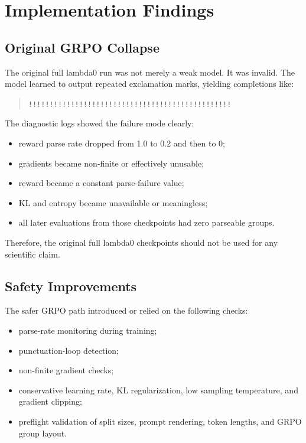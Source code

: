 \documentclass[11pt]{article}
\begin{document}
\section{Implementation Findings}

\subsection{Original GRPO Collapse}

The original full lambda0 run was not merely a weak model. It was invalid. The
model learned to output repeated exclamation marks, yielding completions like:

\begin{quote}
\texttt{!!!!!!!!!!!!!!!!!!!!!!!!!!!!!!!!!!!!!!!!!!!!!!!!}
\end{quote}

The diagnostic logs showed the failure mode clearly:

\begin{itemize}
  \item reward parse rate dropped from 1.0 to 0.2 and then to 0;
  \item gradients became non-finite or effectively unusable;
  \item reward became a constant parse-failure value;
  \item KL and entropy became unavailable or meaningless;
  \item all later evaluations from those checkpoints had zero parseable groups.
\end{itemize}

Therefore, the original full lambda0 checkpoints should not be used for any
scientific claim.

\subsection{Safety Improvements}

The safer GRPO path introduced or relied on the following checks:

\begin{itemize}
  \item parse-rate monitoring during training;
  \item punctuation-loop detection;
  \item non-finite gradient checks;
  \item conservative learning rate, KL regularization, low sampling temperature,
  and gradient clipping;
  \item preflight validation of split sizes, prompt rendering, token lengths,
  and GRPO group layout.
\end{itemize}
\end{document}
